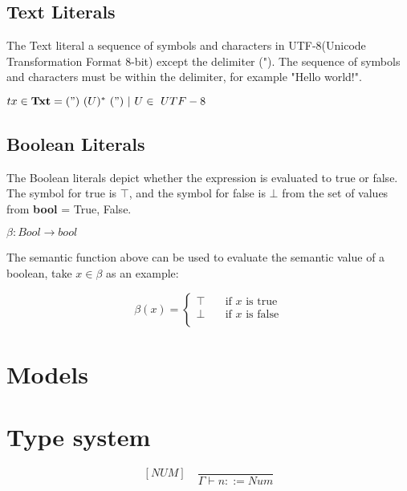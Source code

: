   
  \subsection{Text Literals}
  The Text literal a sequence of symbols and characters in UTF-8(Unicode Transformation Format 8-bit) except the delimiter ("). The sequence of symbols and characters must be within the delimiter, for example "Hello world!".
  
  \begin{math}
  tx \in \textbf{Txt} = (") \ (U)^* \ (")\ |\ U \in \ {UTF-8}
  \end{math}
  
  \subsection{Boolean Literals}
  The Boolean literals depict whether the expression is evaluated to true or false. The symbol for true is \begin{math} \top \end{math}, and the symbol for false is \begin{math} \bot \end{math} from the set of values from \textbf{bool} = {True, False}.
  
  \begin{math}
  	\beta : Bool \rightarrow bool
  \end{math}
  
  The semantic function above can be used to evaluate the semantic value of a boolean, take \begin{math} x \in \beta  \end{math} as an example:
  
  \[ \beta(x) =
    \begin{cases}
      \top       & \quad \text{if } x \text{ is true}\\
      \bot  & \quad \text{if } x \text{ is false}\\
    \end{cases}
  \]
  
  
  \section{Models}
  
  \section{Type system}
  
	\[
	[NUM] \quad
	\dfrac{}{\Gamma \vdash n ::= Num}
	\]
	 
